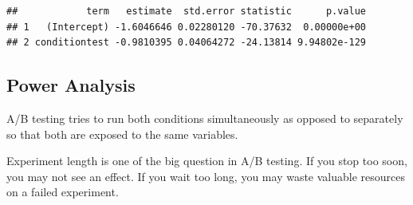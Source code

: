 \documentclass[]{article}
\newenvironment{Shaded}{\begin{snugshade}}{\end{snugshade}}
\newcommand{\KeywordTok}[1]{\textcolor[rgb]{0.13,0.29,0.53}{\textbf{#1}}}
\newcommand{\DataTypeTok}[1]{\textcolor[rgb]{0.13,0.29,0.53}{#1}}
\newcommand{\StringTok}[1]{\textcolor[rgb]{0.31,0.60,0.02}{#1}}
\newcommand{\OperatorTok}[1]{\textcolor[rgb]{0.81,0.36,0.00}{\textbf{#1}}}
\newcommand{\NormalTok}[1]{#1}
\begin{document}
\begin{Shaded}
\end{Shaded}

\begin{verbatim}
##            term   estimate  std.error statistic      p.value
## 1   (Intercept) -1.6046646 0.02280120 -70.37632  0.00000e+00
## 2 conditiontest -0.9810395 0.04064272 -24.13814 9.94802e-129
\end{verbatim}

\subsection{Power Analysis}\label{power-analysis}

A/B testing tries to run both conditions simultaneously as opposed to
separately so that both are exposed to the same variables.

Experiment length is one of the big question in A/B testing. If you stop
too soon, you may not see an effect. If you wait too long, you may waste
valuable resources on a failed experiment.
\end{document}
